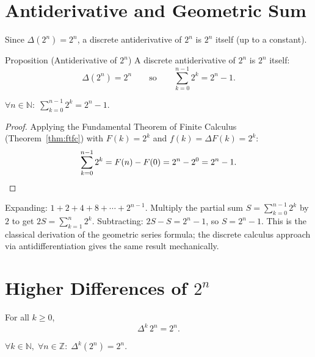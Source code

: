\section*{Antiderivative and Geometric Sum}

Since \(\Delta(2^n) = 2^n\), a discrete antiderivative of \(2^n\) is \(2^n\)
itself (up to a constant).

\begin{propositionbox}{Proposition (Antiderivative of \(2^n\))}
A discrete antiderivative of \(2^n\) is \(2^n\) itself:
\[
\Delta(2^n) = 2^n
\qquad \text{so} \qquad
\sum_{k=0}^{n-1} 2^k = 2^n - 1.
\]
\end{propositionbox}
\label{prop:antideriv-two-n}

\begin{remark*}
\(\forall n \in \mathbb{N}:\;
\displaystyle\sum_{k=0}^{n-1} 2^k = 2^n - 1\).
\end{remark*}

\begin{proof}
Applying the Fundamental Theorem of Finite Calculus
(Theorem~\ref{thm:ftfc}) with \(F(k) = 2^k\) and \(f(k) = \Delta F(k) = 2^k\):
\[
\sum_{k=0}^{n-1} 2^k = F(n) - F(0) = 2^n - 2^0 = 2^n - 1. \qedhere
\]
\end{proof}

\begin{remark*}
Expanding: \(1 + 2 + 4 + 8 + \cdots + 2^{n-1}\). Multiply the partial sum
\(S = \sum_{k=0}^{n-1}2^k\) by \(2\) to get \(2S = \sum_{k=1}^{n}2^k\).
Subtracting: \(2S - S = 2^n - 1\), so \(S = 2^n - 1\). This is the
classical derivation of the geometric series formula; the discrete calculus
approach via antidifferentiation gives the same result mechanically.
\end{remark*}

\section*{\texorpdfstring{Higher Differences of \(2^n\)}{Higher Differences of 2 to the n}}

\begin{proposition}
\label{prop:higher-diff-two-n}
For all \(k \ge 0\),
\[
\Delta^k\, 2^n = 2^n.
\]
\end{proposition}

\begin{remark*}
\(\forall k \in \mathbb{N},\; \forall n \in \mathbb{Z}:\; \Delta^k(2^n) = 2^n\).
\end{remark*}

